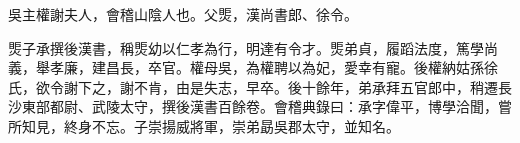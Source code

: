 
\begin{pinyinscope}
吳主權謝夫人，會稽山陰人也。父㷡，漢尚書郎、徐令。

㷡子承撰後漢書，稱㷡幼以仁孝為行，明達有令才。㷡弟貞，履蹈法度，篤學尚義，舉孝廉，建昌長，卒官。權母吳，為權聘以為妃，愛幸有寵。後權納姑孫徐氏，欲令謝下之，謝不肯，由是失志，早卒。後十餘年，弟承拜五官郎中，稍遷長沙東部都尉、武陵太守，撰後漢書百餘卷。會稽典錄曰：承字偉平，博學洽聞，嘗所知見，終身不忘。子崇揚威將軍，崇弟勗吳郡太守，並知名。


\end{pinyinscope}